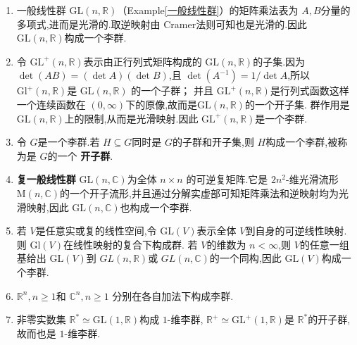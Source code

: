 \documentclass[../../几何与拓扑.tex]{subfiles}
\begin{document}
\begin{example}[李群的例子]
    \begin{enumerate}
        \item 一般线性群 \(  \mathrm{GL}\left( n,\mathbb{R}  \right)   \)（Example\ref{一般线性群}）的矩阵乘法表为 \(  A,B  \)分量的多项式,进而是光滑的.取逆映射由 Cramer法则可知也是光滑的.因此 \(  \mathrm{GL}\left( n,\mathbb{R}  \right)   \)构成一个李群.   
        \item 令 \(  \mathrm{GL}^{+ }\left( n,\mathbb{R}  \right)   \)表示由正行列式矩阵构成的 \(  \mathrm{GL}\left( n,\mathbb{R}  \right)   \)的子集.因为 \(  \det \left( AB \right)= \left( \det A \right)\left( \det  B\right)     \),且 \(  \det \left( A^{-1}  \right)   = 1 / \det A\),所以 \(  \mathrm{Gl}^{+ }\left( n,\mathbb{R}  \right)   \)是 \(  \mathrm{GL}\left( n,\mathbb{R}  \right)   \)      的一个子群；
        并且 \(  \mathrm{GL}^{+ }\left( n,\mathbb{R}  \right)   \)是行列式函数这样一个连续函数在 \(  \left( 0,\infty \right)   \)下的原像,故而是\(  \mathrm{GL}\left( n,\mathbb{R}  \right)   \)的一个开子集.
        群作用是 \(  \mathrm{GL}\left( n,\mathbb{R}  \right)   \)上的限制,从而是光滑映射.因此 \(  \mathrm{GL}^{+ }\left( n,\mathbb{R}  \right)   \)是一个李群. 
        \item 令 \(  G  \)是一个李群.若 \(  H\subseteq G  \)同时是 \(  G  \)的子群和开子集,则 \(  H  \)构成一个李群,被称为是 \(  G  \)的一个 \textbf{开子群}.
        \item \textbf{复一般线性群 } \(  \mathrm{GL}\left( n,\mathbb{C}  \right)   \)为全体 \(  n\times n  \) 的可逆复矩阵.它是 \(  2n^{2}  \)-维光滑流形 \(  \mathrm{M}\left( n,\mathbb{C}  \right)   \)的一个开子流形,并且通过分解实虚部可知矩阵乘法和逆映射均为光滑映射,因此 \(  \mathrm{GL}\left( n,\mathbb{C} \right)   \)也构成一个李群.
        \item 若 \(  V  \)是任意实或复的线性空间,令 \(  \mathrm{GL}\left( V \right)   \)表示全体 \(  V  \)到自身的可逆线性映射.则 \(  \mathrm{Gl}\left( V \right)   \)在线性映射的复合下构成群.
        若 \(  V  \)的维数为 \(  n <\infty  \),则 \(  V  \)的任意一组基给出  \(  \mathrm{GL}\left( V \right)   \)到 \(  GL\left( n,\mathbb{R}  \right)   \)或 \(  GL\left( n,\mathbb{C}  \right)   \)的一个同构,因此 \(  \mathrm{GL}\left( V \right)   \)构成一个李群.
        \item \(  \mathbb{R} ^{n} , n\ge 1  \)和 \(  \mathbb{C}^{n},n\ge 1  \) 分别在各自加法下构成李群.     
        \item 非零实数集 \(  \mathbb{R} ^{*}\simeq \mathrm{GL}\left( 1,\mathbb{R}  \right)   \)构成 \(  1  \)-维李群, \(  \mathbb{R} ^{+ }\simeq  \mathrm{GL}^{+ }\left( 1,\mathbb{R}  \right)   \)是 \(  \mathbb{R} ^{*}  \)的开子群,故而也是 \(  1  \)-维李群.

\end{enumerate}
\end{example}
\end{document}
